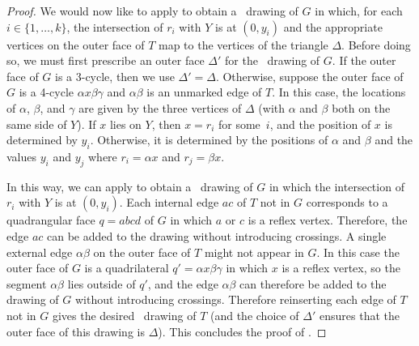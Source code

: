 \begin{proof}
We would now like to apply  to obtain a \Fary\ drawing
of $G$ in which, for each $i\in\{1,\ldots,k\}$, the intersection of
$r_i$ with $Y$ is at $(0,y_i)$ and the appropriate vertices on the
outer face of $T$ map to the vertices of the triangle $\Delta$.
Before doing so, we must first prescribe an outer face $\Delta'$ for
the \Fary\ drawing of $G$.  If the outer face of $G$ is a 3-cycle,
then we use $\Delta'=\Delta$.  Otherwise, suppose the outer face of
$G$ is a 4-cycle $\alpha x\beta\gamma$ and $\alpha\beta$ is an
unmarked edge of $T$.  In this case, the locations of $\alpha$,
$\beta$, and $\gamma$ are given by the three vertices of $\Delta$
(with $\alpha$ and $\beta$ both on the same side of $Y$).
If $x$ lies on $Y$,
then $x=r_i$ for some~$i$, %
and the
position of $x$ is determined by $y_i$.
Otherwise, it is determined
by the positions of $\alpha$ and $\beta$ and the values
$y_{i}$ and $y_j$ where $r_i=\alpha x$ and $r_j=\beta x$.

	In this way, we can apply  to
	obtain a \Fary\ drawing of $G$ in which the intersection of $r_i$
	with $Y$ is at $(0,y_i)$.  Each internal edge $ac$ of $T$ not in $G$
	corresponds to a quadrangular face $q=abcd$ of $G$ in which $a$ or $c$ is a
	reflex vertex.  Therefore, the edge $ac$ can be added to the drawing
	without introducing crossings.  A single external edge $\alpha\beta$
	on the outer face of $T$ might not appear in $G$. In this case the outer
	face of $G$ is a quadrilateral $q'=\alpha x \beta \gamma$ in which $x$ is
	a reflex vertex, so the segment $\alpha\beta$ lies outside of $q'$, and the edge $\alpha\beta$ can therefore be added to the drawing of $G$
	without introducing crossings. Therefore reinserting each edge of $T$ not in $G$ gives the desired \Fary\ drawing of $T$ (and the choice of $\Delta'$ ensures that the outer face of this drawing is $\Delta$). 
        This concludes the proof of .
\end{proof}
	
